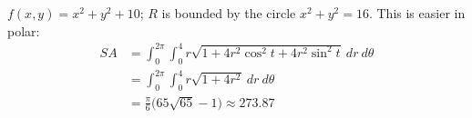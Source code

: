 {$f(x,y) = x^2+y^2+10$; $R$ is bounded by the circle $x^2+y^2=16$.
}
{This is easier in polar:
\begin{align*}SA &= \int_{0}^{2\pi}\int_{0}^{4} r\sqrt{1+ 4r^2\cos^2t+4r^2\sin^2t}\ dr\ d\theta\\
		&= \int_0^{2\pi}\int_0^4r\sqrt{1+4r^2}\ dr\ d\theta \\
		&= \frac{\pi}{6}\big(65\sqrt{65}-1\big) \approx 273.87
\end{align*}
}